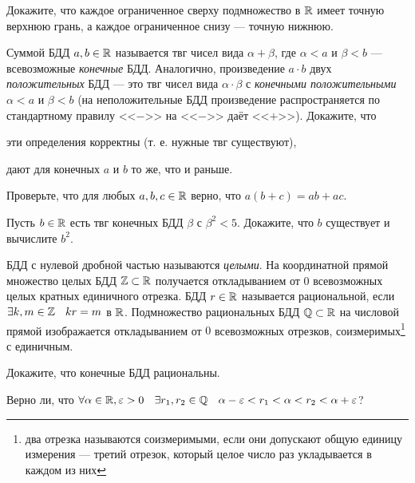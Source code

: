\documentclass[a4paper, 12pt, num=26]{listok}
\begin{document}
\begin{problem}\label{completness}
	Докажите, что каждое ограниченное сверху подмножество в $\mathbb{R}$ имеет точную верхнюю грань,
	а каждое ограниченное снизу --- точную нижнюю.
\end{problem}
\begin{problem}
	Суммой БДД $a, b \in \mathbb{R}$ называется твг чисел вида $\alpha + \beta$,
	где $\alpha < a$ и $\beta < b$ --- всевозможные \textit{конечные} БДД.
	Аналогично, произведение $a\cdot b$ двух \textit{положительных} БДД --- это твг чисел вида
	$\alpha \cdot \beta$ с \textit{конечными положительными} $\alpha < a$ и $\beta < b$
	(на неположительные БДД произведение распространяется по стандартному правилу <<$-$>> на <<$-$>> даёт <<$+$>>).
	Докажите, что
	\begin{probparts}
		\item эти определения корректны (т. е. нужные твг существуют),
		\item дают для конечных $a$ и $b$ то же, что и раньше.
		\item Проверьте, что для любых $a, b, c \in \mathbb{R}$ верно, что $a(b + c) = ab + ac$.
	\end{probparts}
\end{problem}
\begin{problem}[ (корни)]\label{roots}
	Пусть $b \in \mathbb{R}$ есть твг конечных БДД $\beta$ с $\beta^2 < 5$.
	Докажите, что $b$ существует и вычислите $b^2$.
\end{problem}
\begin{definition}
	БДД с нулевой дробной частью называются \textit{целыми}.
	На координатной прямой множество целых БДД $\mathbb{Z} \subset \mathbb{R}$ получается откладыванием от $0$ всевозможных целых кратных единичного отрезка.
	БДД $r \in \mathbb{R}$ называется рациональной, если $\exists{k,m \in \Z} kr = m$ в $\mathbb{R}$.
	Подмножество рациональных БДД $\mathbb{Q} \subset \mathbb{R}$ на числовой прямой изображается откладыванием от $0$ всевозможных отрезков,
	соизмеримых\footnote{два отрезка называются соизмеримыми, если они допускают общую единицу измерения --- третий отрезок,
	который целое число раз укладывается в каждом из них} с единичным.
\end{definition}
\begin{problem}
	Докажите, что конечные БДД рациональны.
\end{problem}
\begin{problem}
	Верно ли, что $\forall{\alpha \in \R, \epsilon > 0} \exists{r_1, r_2 \in \Q} \alpha - \epsilon < r_1 < \alpha < r_2 < \alpha + \epsilon$?
\end{problem}
\end{document}
